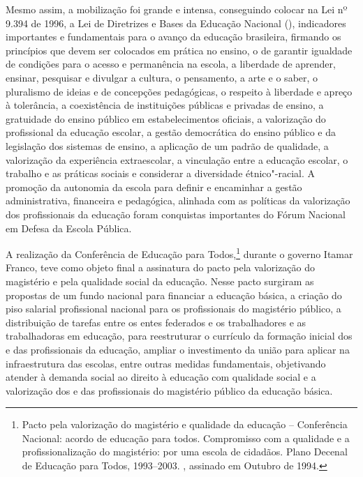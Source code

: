 Mesmo assim, a mobilização foi grande e intensa, conseguindo colocar na
Lei nº 9.394 de 1996, a Lei de Diretrizes e Bases da Educação Nacional
(), indicadores importantes e fundamentais para o avanço da educação
brasileira, firmando os princípios que devem ser colocados em prática no
ensino, o de garantir igualdade de
condições para o acesso e permanência na escola,
a liberdade de aprender, ensinar,
pesquisar e divulgar a cultura, o pensamento, a arte e o saber,
o pluralismo de ideias e de concepções
pedagógicas, o respeito à liberdade e
apreço à tolerância, a coexistência de
instituições públicas e privadas de
ensino, a gratuidade do ensino público
em estabelecimentos oficiais, a
valorização do profissional da educação
escolar, a gestão democrática do
ensino público e da legislação dos sistemas de ensino,
a aplicação de um padrão de qualidade,
a valorização da experiência
extraescolar, a vinculação entre a
educação escolar, o trabalho e as práticas sociais
e considerar a diversidade
étnico"-racial. A promoção da autonomia da escola para definir e
encaminhar a gestão administrativa, financeira e pedagógica, alinhada
com as políticas da valorização dos profissionais da educação foram
conquistas importantes do Fórum Nacional em Defesa da Escola
Pública.

A realização da Conferência de Educação para Todos,\footnote{Pacto pela
  valorização do magistério e qualidade da educação -- Conferência
  Nacional: acordo de educação para todos. Compromisso com a qualidade e
  a profissionalização do magistério: por uma escola de cidadãos. Plano
  Decenal de Educação para Todos, 1993--2003. , assinado em Outubro de
  1994.} durante o governo Itamar Franco, teve como objeto final a
assinatura do pacto pela valorização do magistério e pela qualidade
social da educação. Nesse pacto surgiram as propostas de um fundo
nacional para financiar a educação básica, a criação do piso salarial
profissional nacional para os profissionais do magistério público, a
distribuição de tarefas entre os entes federados e os trabalhadores e as
trabalhadoras em educação, para reestruturar o currículo da formação
inicial dos e das profissionais da educação, ampliar o investimento da
união para aplicar na infraestrutura das escolas, entre outras medidas
fundamentais, objetivando atender à demanda social ao direito à educação
com qualidade social e a valorização dos e das profissionais do
magistério público da educação básica.


